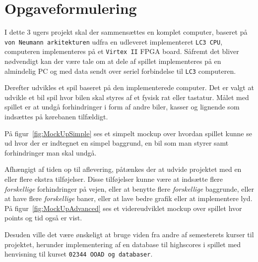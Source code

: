 \chapter{Opgaveformulering}\label{cha:opgaveformulering}
I dette 3 ugers projekt skal der sammensættes en komplet computer, baseret på \texttt{von Neumann arkitekturen} udfra en udleveret implementeret \texttt{LC3 CPU}, computeren implementeres på et \texttt{Virtex II} FPGA board. Såfremt det bliver nødvendigt kan der være tale om at dele af spillet implementeres på en almindelig PC og med data sendt over seriel forbindelse til \texttt{LC3} computeren.

Derefter udvikles et spil baseret på den implementerede computer. Det er valgt at udvikle et bil spil hvor bilen skal styres af et fysisk rat eller tastatur. Målet med spillet er at undgå forhindringer i form af andre biler, kasser og lignende som indsættes på kørebanen tilfældigt.

På figur~\vref{fig:MockUpSimple} ses et simpelt mockup over hvordan spillet kunne se ud hvor der er indtegnet en simpel baggrund, en bil som man styrer samt forhindringer man skal undgå.

Afhængigt af tiden op til aflevering, påtænkes der at udvide projektet med en eller flere ekstra tilføjelser. Disse tilføjelser kunne være at indsætte flere \textit{forskellige} forhindringer på vejen, eller at benytte flere \textit{forskellige} baggrunde, eller at have flere \textit{forskellige} baner, eller at lave bedre grafik eller at implementere lyd. På figur~\vref{fig:MockUpAdvanced} ses et videreudviklet mockup over spillet hvor points og tid også er vist.

Desuden ville det være ønskeligt at bruge viden fra andre af semesterets kurser til projektet, herunder implementering af en database til highscores i spillet med henvisning til kurset \texttt{02344 OOAD og databaser}.